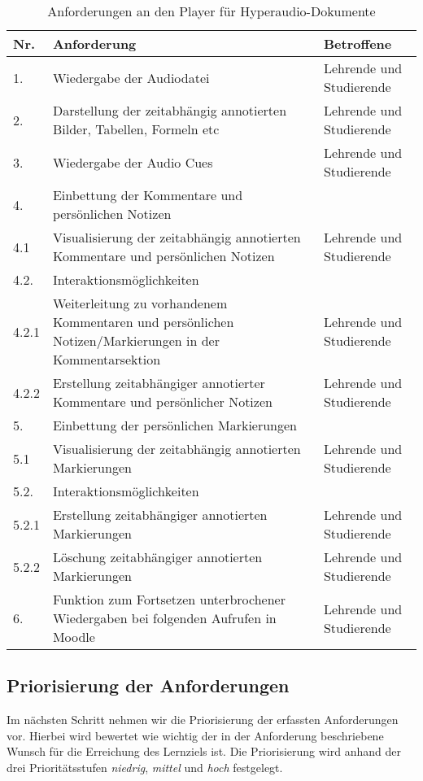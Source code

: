 \begin{table}[!ht]
\def\arraystretch{1.4}
\caption{Anforderungen an den Player für Hyperaudio-Dokumente}
\label{tab:AnforderungenPlayer}
 \begin{tabularx}{\textwidth}{lXl}      
    \hline
    Nr. & Anforderung & Betroffene 
    \\\hline
    1. & Wiedergabe der Audiodatei & Lehrende und Studierende\\
    2. & Darstellung der zeitabhängig annotierten Bilder, Tabellen, Formeln etc & Lehrende und Studierende\\
    3. & Wiedergabe der Audio Cues & Lehrende und Studierende\\
    4. & Einbettung der Kommentare und persönlichen Notizen & \\
    4.1 & Visualisierung der zeitabhängig annotierten Kommentare und persönlichen Notizen & Lehrende und Studierende\\
    4.2. & Interaktionsmöglichkeiten & \\
    4.2.1 & Weiterleitung zu vorhandenem Kommentaren und persönlichen Notizen/Markierungen in der Kommentarsektion  & Lehrende und Studierende\\
    4.2.2 & Erstellung zeitabhängiger annotierter Kommentare und persönlicher Notizen & Lehrende und Studierende\\
    5. & Einbettung der persönlichen Markierungen & \\
    5.1 & Visualisierung der zeitabhängig annotierten Markierungen & Lehrende und Studierende\\
    5.2. & Interaktionsmöglichkeiten & \\
    5.2.1 & Erstellung zeitabhängiger annotierten Markierungen  & Lehrende und Studierende\\
    5.2.2 & Löschung zeitabhängiger annotierten Markierungen & Lehrende und Studierende\\
    6. & Funktion zum Fortsetzen unterbrochener Wiedergaben bei folgenden Aufrufen in Moodle & Lehrende und Studierende\\
    \hline
    \end{tabularx}
\end{table}

\subsection{Priorisierung der Anforderungen}
Im nächsten Schritt nehmen wir die Priorisierung der erfassten Anforderungen vor. Hierbei wird bewertet wie wichtig der in der Anforderung beschriebene Wunsch für die Erreichung des Lernziels ist. Die Priorisierung wird anhand der drei Prioritätsstufen \textit{niedrig}, \textit{mittel} und \textit{hoch} festgelegt.

